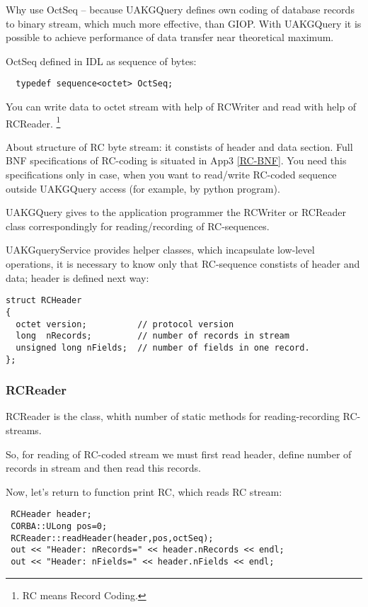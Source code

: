 \documentclass[10pt]{article}
\begin{document}
 Why use OctSeq -- because UAKGQuery defines own coding of database records to
 binary stream, which much more effective, than GIOP. With UAKGQuery it is
 possible to achieve performance of data transfer near theoretical
 maximum.

OctSeq defined in IDL as sequence of bytes:
\begin{verbatim}
  typedef sequence<octet> OctSeq;
\end{verbatim}


 You can write data to octet stream with help of RCWriter and read
 with help of RCReader. 
 \footnote{RC means Record Coding. }

 About structure of RC byte stream: it constists of header and data section.
 Full BNF specifications of RC-coding is situated in App3 \ref{RC-BNF}.
 You need this specifications only in case, when you want to read/write
 RC-coded sequence outside UAKGQuery access (for example, by python program).

UAKGQuery gives to the application programmer the RCWriter or RCReader class correspondingly for reading/recording of RC-sequences.

 UAKGqueryService provides helper classes, which incapsulate low-level operations, it is necessary to know only that RC-sequence constists of header and data;
 header is defined next way:
\begin{verbatim}
struct RCHeader
{
  octet version;          // protocol version
  long  nRecords;         // number of records in stream
  unsigned long nFields;  // number of fields in one record.
};
\end{verbatim}

\subsubsection{ RCReader }

RCReader is the class, whith number of static methods for reading-recording RC-streams.

 So, for reading of RC-coded stream we must first read
 header, define number of records in stream and then read this
 records.

 Now, let's return to function print RC, which reads RC stream:
 
\begin{verbatim}
 RCHeader header;
 CORBA::ULong pos=0;
 RCReader::readHeader(header,pos,octSeq);
 out << "Header: nRecords=" << header.nRecords << endl;
 out << "Header: nFields=" << header.nFields << endl;
\end{verbatim}
\end{document}
